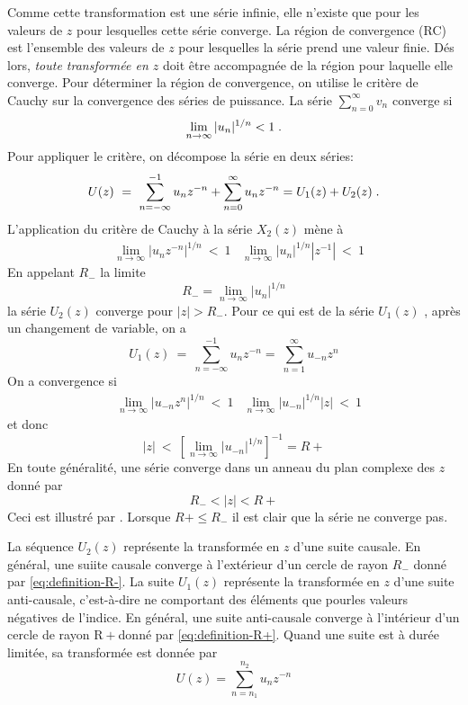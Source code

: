 Comme cette transformation est une s\'{e}rie infinie, elle n'existe que pour les valeurs de $z$ pour lesquelles cette s\'{e}rie converge. La r\'{e}gion de convergence (RC) est l'ensemble des valeurs de $z$ pour lesquelles la s\'{e}rie prend une valeur finie. D\'{e}s lors, \emph{toute transform\'{e}e en $z$} doit \^{e}tre accompagnée de la région pour laquelle elle converge. Pour d\'{e}terminer la r\'{e}gion de convergence, on utilise le crit\`{e}re de Cauchy sur la convergence des s\'{e}ries de puissance. La s\'{e}rie $ \sum_{n=0}^{\infty} v_n$
converge si
\begin{equation}
\label{eq:critere-cauchy}
\lim_{n\rightarrow\infty}|u_{n}|^{1/n}<1 \;.
\end{equation}
Pour appliquer le crit\`{e}re, on d\'{e}compose la s\'{e}rie en deux s\'{e}ries:
$$
U(z)\ =\ \sum_{n=-\infty}^{-1} u_n z^{-n}+\sum_{n=0}^{\infty} u_n z^{-n} = U_1(z) + U_2(z) \;.
$$
L'application du crit\`{e}re de Cauchy \`{a} la s\'{e}rie $X_{2}(z)$ m\`{e}ne \`{a}
\begin{align*}
&\lim_{n\rightarrow\infty}| u_n z^{-n}|^{1/n}\ <\ 1
&\lim_{n\rightarrow\infty}| u_n |^{1/n}|z^{-1}|\ <\ 1
\end{align*}
En appelant $R_{-}$ la limite
\begin{equation}
\label{eq:definition-R-}
R_{-}=\lim_{n\rightarrow\infty}|u_n|^{1/n}
\end{equation}
la s\'{e}rie $U_{2}(z)$ converge pour $|z|>R_{-}$.
Pour ce qui est de la s\'{e}rie $U_{1}(z)$ , apr\`{e}s un changement de variable, on a
$$
U_{1}(z)\ =\ \sum_{n=-\infty}^{-1} u_n z^{-n} =\ \sum_{n=1}^{\infty} u_{-n} z^{n}
$$
On a convergence si
\begin{align*}
&\lim_{n\rightarrow\infty}|u_{-n} z^{n}|^{1/n}\ <\ 1
&\lim_{n\rightarrow\infty}|u_{-n}|^{1/n}|z|\ <\ 1
\end{align*}
et donc
\begin{equation}
\label{eq:definition-R+}
|z|\ <\ [\lim_{n\rightarrow\infty}|u_{-n}|^{1/n}]^{-1}=R+
\end{equation}
En toute g\'{e}n\'{e}ralit\'{e}, une s\'{e}rie converge dans un anneau du plan complexe des $z$ donn\'{e} par
$$
R_{-}<|z|<R+
$$
Ceci est illustr\'{e} par . Lorsque $R+\leq R_{-}$ il est clair que la s\'{e}rie ne converge pas.

La s\'{e}quence $U_{2}(z)$ repr\'{e}sente la transform\'{e}e en $z$ d'une suite causale. En g\'{e}n\'{e}ral, une suiite causale converge \`{a} l'ext\'{e}rieur d'un cercle de rayon $R_{-}$ donn\'{e} par \eqref{eq:definition-R-}. La suite $U_{1}(z)$ repr\'{e}sente la transform\'{e}e en $z$ d'une suite anti-causale, c'est-\`{a}-dire ne comportant des \'{e}l\'{e}ments que pourles valeurs n\'{e}gatives de l'indice. En g\'{e}n\'{e}ral, une suite anti-causale converge \`{a} l'int\'{e}rieur d'un cercle de rayon $\mathrm{R}+$donn\'{e} par \eqref{eq:definition-R+}. Quand une suite est \`{a} dur\'{e}e limit\'{e}e, sa transform\'{e}e est donn\'{e}e par
\begin{equation}
\label{eq:z-duree-limitee}
U(z)=\sum_{n=n_{1}}^{n_{2}} u_n z^{-n}
\end{equation}


